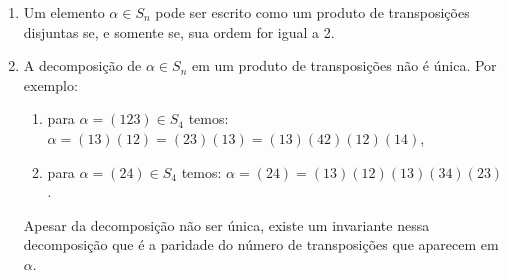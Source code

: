 \begin{observacoes}
	\begin{enumerate}
		\item Um elemento $\alpha \in S_n$ pode ser escrito como um produto de transposi\c{c}\~oes disjuntas se, e somente se, sua ordem for igual a 2.

		\item A decomposi\c{c}\~ao de $\alpha \in S_n$ em um produto de transposi\c{c}\~oes n\~ao \'e \'unica. Por exemplo:
		\begin{enumerate}
			\item para $\alpha = (123) \in S_4$ temos: $\alpha = (13)(12) = (23)(13) = (13)(42)(12)(14)$,
			\item para $\alpha = (24) \in S_4$ temos: $\alpha = (24) = (13)(12)(13)(34)(23)$.
		\end{enumerate}
		Apesar da decomposi\c{c}\~ao n\~ao ser \'unica, existe um invariante nessa decomposi\c{c}\~ao que \'e a paridade do n\'umero de transposi\c{c}\~oes que aparecem em $\alpha$.
	\end{enumerate}
\end{observacoes}


